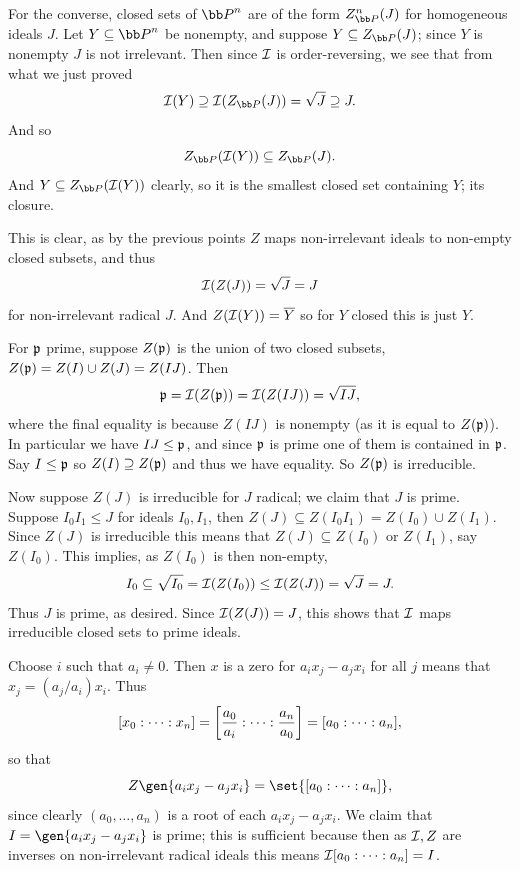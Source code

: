     For the converse, closed sets of $\bP^n$ are of the form $Z_\bP^n(J)$ for homogeneous ideals $J$.
    Let $Y\subseteq\bP^n$ be nonempty, and suppose $Y\subseteq Z_\bP(J)$; since $Y$ is nonempty $J$ is not irrelevant.
    Then since ${{\cal I}}$ is order-reversing, we see that from what we just proved
    $$ \I(Y) \supseteq \I(Z_\bP(J)) = \sqrt J \supseteq J . $$
    And so
    $$ Z_\bP(\I(Y)) \subseteq Z_\bP(J) . $$
    And $Y\subseteq Z_\bP(\I(Y))$ clearly, so it is the smallest closed set containing $Y$; its closure.

    \item \benum
        \item This is clear, as by the previous points $Z$ maps non-irrelevant ideals to non-empty closed subsets, and thus
        $$ {{\cal I}}(Z(J)) = \sqrt J = J $$
        for non-irrelevant radical $J$.
        And $Z({{\cal I}}(Y))={\overline{Y}}$ so for $Y$ closed this is just $Y$.

        \item For ${{\frak p}}$ prime, suppose $Z({{\frak p}})$ is the union of two closed subsets, $Z({{\frak p}})=Z(I)\cup Z(J)=Z(IJ)$.
        Then
        $$ {{\frak p}} = {{\cal I}}(Z({{\frak p}})) = {{\cal I}}(Z(IJ)) = \sqrt{IJ} , $$
        where the final equality is because $Z(IJ)$ is nonempty (as it is equal to $Z({{\frak p}})$).
        In particular we have $IJ\leq{{\frak p}}$, and since ${{\frak p}}$ is prime one of them is contained in ${{\frak p}}$.
        Say $I\leq{{\frak p}}$ so $Z(I)\supseteq Z({{\frak p}})$ and thus we have equality.
        So $Z({{\frak p}})$ is irreducible.

        Now suppose $Z(J)$ is irreducible for $J$ radical; we claim that $J$ is prime.
        Suppose $I_0I_1\leq J$ for ideals $I_0,I_1$, then $Z(J)\subseteq Z(I_0I_1)=Z(I_0)\cup Z(I_1)$.
        Since $Z(J)$ is irreducible this means that $Z(J)\subseteq Z(I_0)$ or $Z(I_1)$, say $Z(I_0)$.
        This implies, as $Z(I_0)$ is then non-empty,
        $$ I_0 \subseteq \sqrt{I_0} = {{\cal I}}(Z(I_0)) \leq {{\cal I}}(Z(J)) = \sqrt J = J . $$
        Thus $J$ is prime, as desired.
        Since ${{\cal I}}(Z(J))=J$, this shows that ${{\cal I}}$ maps irreducible closed sets to prime ideals.

        \item Choose $i$ such that $a_i\neq0$.
        Then $x$ is a zero for $a_ix_j-a_jx_i$ for all $j$ means that $x_j=(a_j/a_i)x_i$.
        Thus
        $$ [x_0:\cdots:x_n] = \mathopen{}\mathclose{\left[{{a_0}\over{a_i}}:\cdots:{{a_n}\over{a_0}}\right]} = [a_0:\cdots:a_n] , $$
        so that
        $$ Z\gen{a_ix_j-a_jx_i} = \set{[a_0:\cdots:a_n]} , $$
        since clearly $(a_0,\dots,a_n)$ is a root of each $a_ix_j-a_jx_i$.
        We claim that $I=\gen{a_ix_j-a_jx_i}$ is prime; this is sufficient because then as ${{\cal I}},Z$ are inverses on non-irrelevant radical
        ideals this means ${{\cal I}}[a_0:\cdots:a_n]=I$.

